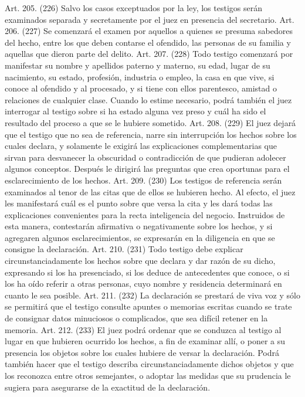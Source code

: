     Art. 205. (226) Salvo los casos exceptuados por la ley, los testigos serán examinados separada y secretamente por el juez en presencia del secretario.
    Art. 206. (227) Se comenzará el examen por aquellos a quienes se presuma sabedores del hecho, entre los que deben contarse el ofendido, las personas de su familia y aquellas que dieron parte del delito.
    Art. 207. (228) Todo testigo comenzará por manifestar su nombre y apellidos paterno y materno, su edad, lugar de su nacimiento, su estado, profesión, industria o empleo, la casa en que vive, si conoce al ofendido y al procesado, y si tiene con ellos parentesco, amistad o relaciones de cualquier clase.
    Cuando lo estime necesario, podrá también el juez interrogar al testigo sobre si ha estado alguna vez preso y cuál ha sido el resultado del proceso a que se le hubiere sometido.
    Art. 208. (229) El juez dejará que el testigo que no sea de referencia, narre sin interrupción los hechos sobre los cuales declara, y solamente le exigirá las explicaciones complementarias que sirvan para desvanecer la obscuridad o contradicción de que pudieran adolecer algunos conceptos.
    Después le dirigirá las preguntas que crea oportunas para el esclarecimiento de los hechos.
    Art. 209. (230) Los testigos de referencia serán examinados al tenor de las citas que de ellos se hubieren hecho.
    Al efecto, el juez les manifestará cuál es el punto sobre que versa la cita y les dará todas las explicaciones convenientes para la recta inteligencia del negocio. Instruidos de esta manera, contestarán afirmativa o negativamente sobre los hechos, y si agregaren algunos esclarecimientos, se expresarán en la diligencia en que se consigne la declaración.
    Art. 210. (231) Todo testigo debe explicar circunstanciadamente los hechos sobre que declara y dar razón de su dicho, expresando si los ha presenciado, si los deduce de antecedentes que conoce, o si los ha oído referir a otras personas, cuyo nombre y residencia determinará en cuanto le sea posible.
    Art. 211. (232) La declaración se prestará de viva voz y sólo se permitirá que el testigo consulte apuntes o memorias escritas cuando se trate de consignar datos minuciosos o complicados, que sea difícil retener en la memoria.
    Art. 212. (233) El juez podrá ordenar que se conduzca al testigo al lugar en que hubieren ocurrido los hechos, a fin de examinar allí, o poner a su presencia los objetos sobre los cuales hubiere de versar la declaración.
    Podrá también hacer que el testigo describa circunstanciadamente dichos objetos y que los reconozca entre otros semejantes, o adoptar las medidas que su prudencia le sugiera para asegurarse de la exactitud de la declaración.
